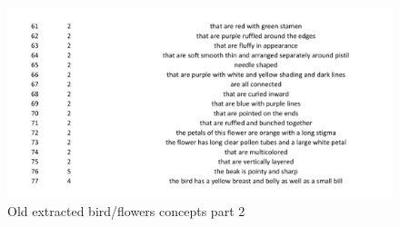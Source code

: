 \begin{figure}[h]
\caption{Old extracted bird/flowers concepts part 2}
\centering
\includegraphics[width=\textwidth]{appendix/birds_old2.png}
\end{figure}


